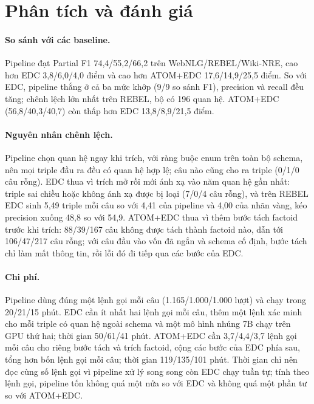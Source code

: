 \section{Phân tích và đánh giá}\label{sec:exp-analysis}

\paragraph*{So sánh với các baseline.}
Pipeline đạt Partial F1 74,4/55,2/66,2 trên WebNLG/REBEL/Wiki-NRE, cao hơn EDC 3,8/6,0/4,0 điểm và cao hơn ATOM+EDC 17,6/14,9/25,5 điểm.
So với EDC, pipeline thắng ở cả ba mức khớp (9/9 so sánh F1), precision và recall đều tăng; chênh lệch lớn nhất trên REBEL, bộ có 196 quan hệ.
ATOM+EDC (56,8/40,3/40,7) còn thấp hơn EDC 13,8/8,9/21,5 điểm.

\paragraph*{Nguyên nhân chênh lệch.}
Pipeline chọn quan hệ ngay khi trích, với ràng buộc enum trên toàn bộ schema, nên mọi triple đầu ra đều có quan hệ hợp lệ; câu nào cũng cho ra triple (0/1/0 câu rỗng).
EDC thua vì trích mở rồi mới ánh xạ vào năm quan hệ gần nhất: triple sai chiều hoặc không ánh xạ được bị loại (7/0/4 câu rỗng), và trên REBEL EDC sinh 5,49 triple mỗi câu so với 4,41 của pipeline và 4,00 của nhãn vàng, kéo precision xuống 48,8 so với 54,9.
ATOM+EDC thua vì thêm bước tách factoid trước khi trích: 88/39/167 câu không được tách thành factoid nào, dẫn tới 106/47/217 câu rỗng; với câu đầu vào vốn đã ngắn và schema cố định, bước tách chỉ làm mất thông tin, rồi lỗi đó đi tiếp qua các bước của EDC.

\paragraph*{Chi phí.}
Pipeline dùng đúng một lệnh gọi mỗi câu (1.165/1.000/1.000 lượt) và chạy trong 20/21/15 phút.
EDC cần ít nhất hai lệnh gọi mỗi câu, thêm một lệnh xác minh cho mỗi triple có quan hệ ngoài schema và một mô hình nhúng 7B chạy trên GPU thứ hai; thời gian 50/61/41 phút.
ATOM+EDC cần 3,7/4,4/3,7 lệnh gọi mỗi câu cho riêng bước tách và trích factoid, cộng các bước của EDC phía sau, tổng hơn bốn lệnh gọi mỗi câu; thời gian 119/135/101 phút.
Thời gian chỉ nên đọc cùng số lệnh gọi vì pipeline xử lý song song còn EDC chạy tuần tự; tính theo lệnh gọi, pipeline tốn không quá một nửa so với EDC và không quá một phần tư so với ATOM+EDC.

